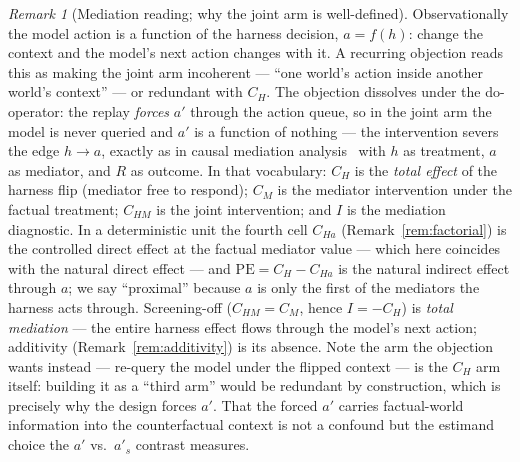 \documentclass{article}
\theoremstyle{remark}
\newtheorem{remark}{Remark}
\begin{document}
\begin{remark}[Mediation reading; why the joint arm is well-defined]
\label{rem:mediation}
Observationally the model action is a function of the harness decision,
$a = f(h)$: change the context and the model's next action changes with
it. A recurring objection reads this as making the joint arm incoherent
--- ``one world's action inside another world's context'' --- or
redundant with $C_H$. The objection dissolves under the do-operator: the
replay \emph{forces} $a'$ through the action queue, so in the joint arm
the model is never queried and $a'$ is a function of nothing --- the
intervention severs the edge $h \to a$, exactly as in causal mediation
analysis~\citep{pearl2001direct} with $h$ as treatment, $a$ as mediator,
and $R$ as outcome. In that vocabulary: $C_H$ is the \emph{total effect}
of the harness flip (mediator free to respond); $C_M$ is the mediator
intervention under the factual treatment; $C_{HM}$ is the joint
intervention; and $I$ is the mediation diagnostic. In a deterministic
unit the fourth cell $C_{Ha}$ (Remark~\ref{rem:factorial}) is the
controlled direct effect at the factual mediator value --- which here
coincides with the natural direct effect --- and $\mathrm{PE} = C_H -
C_{Ha}$ is the natural indirect effect through $a$; we say ``proximal''
because $a$ is only the first of the mediators the harness acts through.
Screening-off
($C_{HM}=C_M$, hence $I=-C_H$) is \emph{total mediation} --- the entire
harness effect flows through the model's next action; additivity
(Remark~\ref{rem:additivity}) is its absence. Note the arm the objection
wants instead --- re-query the model under the flipped context --- is the
$C_H$ arm itself: building it as a ``third arm'' would be redundant by
construction, which is precisely why the design forces $a'$. That the
forced $a'$ carries factual-world information into the counterfactual
context is not a confound but the estimand choice the $a'$ vs.\ $a'_s$
contrast measures.
\end{remark}
\end{document}
